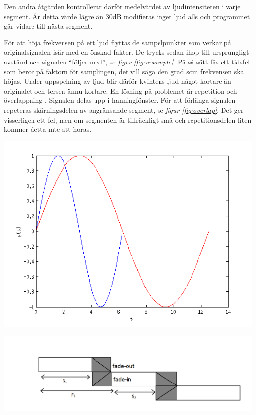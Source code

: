 \documentclass[12pt,a4paper]{article}
\newenvironment{Figure}
  {\par\medskip\noindent\minipage{\linewidth}}
  {\endminipage\par\medskip}
\begin{document}
Den andra åtgärden kontrollerar därför medelvärdet av ljudintensiteten i varje segment. Är detta värde lägre än 30dB modifieras inget ljud alls och programmet går vidare till nästa segment.

För att höja frekvensen på ett ljud flyttas de sampelpunkter som verkar på originalsignalen isär med en önskad faktor. De trycks sedan ihop till ursprungligt avstånd och signalen “följer med”, se \emph{figur \ref{fig:resample}}. På så sätt fås ett tidsfel som beror på faktorn för samplingen, det vill säga den grad som frekvensen ska höjas. Under uppspelning av ljud blir därför kvintens ljud något kortare än originalet och tersen ännu kortare. En lösning på problemet är repetition och överlappning \cite{bib:tfya}. Signalen delas upp i hanningfönster. För att förlänga signalen repeteras skärningsdelen av angränsande segment, se \emph{figur \ref{fig:overlap}}. Det ger visserligen ett fel, men om segmenten är tillräckligt små och repetitionsdelen liten kommer detta inte att höras.

\begin{Figure}
  \centering
    \includegraphics[width=0.7\linewidth]{./images/resample.png}
\end{Figure}

\begin{Figure}
  \centering
    \includegraphics[width=0.7\linewidth]{./images/overlap.png}
\end{Figure}
\end{document}
